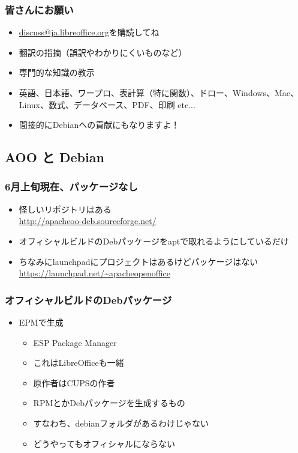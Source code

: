 \documentclass[mingoth,a4paper]{jsarticle}
\begin{document}
\subsubsection{皆さんにお願い}
\begin{itemize}
\item \url{discuss@ja.libreoffice.org}を購読してね
\item 翻訳の指摘（誤訳やわかりにくいものなど）
\item 専門的な知識の教示
\item 英語、日本語、ワープロ、表計算（特に関数）、ドロー、Windows、Mac、Linux、数式、データベース、PDF、印刷 etc...
\item 間接的にDebianへの貢献にもなりますよ！
\end{itemize}

\subsection{AOO と Debian}
\subsubsection{6月上旬現在、パッケージなし}
\begin{itemize}
\item 怪しいリポジトリはある\\
\url{http://apacheoo-deb.sourceforge.net/}
\item オフィシャルビルドのDebパッケージをaptで取れるようにしているだけ
\item ちなみにlaunchpadにプロジェクトはあるけどパッケージはない\\
\url{https://launchpad.net/~apacheopenoffice}
\end{itemize}

\subsubsection{オフィシャルビルドのDebパッケージ}
\begin{itemize}
\item EPMで生成
\begin{itemize}
\item ESP Package Manager
\item これはLibreOfficeも一緒
\item 原作者はCUPSの作者
\item RPMとかDebパッケージを生成するもの
\item すなわち、debianフォルダがあるわけじゃない
\item どうやってもオフィシャルにならない
\end{itemize}
\end{itemize}
\end{document}
